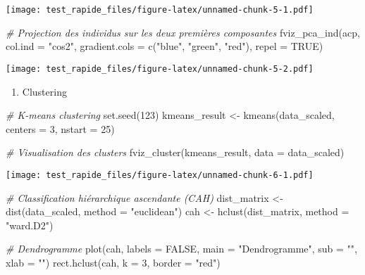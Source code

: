 \documentclass[
]{article}
\newenvironment{Shaded}{\begin{snugshade}}{\end{snugshade}}
\newcommand{\AttributeTok}[1]{\textcolor[rgb]{0.77,0.63,0.00}{#1}}
\newcommand{\CommentTok}[1]{\textcolor[rgb]{0.56,0.35,0.01}{\textit{#1}}}
\newcommand{\ConstantTok}[1]{\textcolor[rgb]{0.00,0.00,0.00}{#1}}
\newcommand{\DecValTok}[1]{\textcolor[rgb]{0.00,0.00,0.81}{#1}}
\newcommand{\FunctionTok}[1]{\textcolor[rgb]{0.00,0.00,0.00}{#1}}
\newcommand{\NormalTok}[1]{#1}
\newcommand{\OtherTok}[1]{\textcolor[rgb]{0.56,0.35,0.01}{#1}}
\newcommand{\StringTok}[1]{\textcolor[rgb]{0.31,0.60,0.02}{#1}}
\providecommand{\tightlist}{%
  \setlength{\itemsep}{0pt}\setlength{\parskip}{0pt}}
\begin{document}
\texttt{[image: test\_rapide\_files/figure-latex/unnamed-chunk-5-1.pdf]}

\begin{Shaded}
\begin{Highlighting}[]
\CommentTok{\# Projection des individus sur les deux premières composantes}
\FunctionTok{fviz\_pca\_ind}\NormalTok{(acp, }\AttributeTok{col.ind =} \StringTok{"cos2"}\NormalTok{, }\AttributeTok{gradient.cols =} \FunctionTok{c}\NormalTok{(}\StringTok{"blue"}\NormalTok{, }\StringTok{"green"}\NormalTok{, }\StringTok{"red"}\NormalTok{), }\AttributeTok{repel =} \ConstantTok{TRUE}\NormalTok{)}
\end{Highlighting}
\end{Shaded}

\texttt{[image: test\_rapide\_files/figure-latex/unnamed-chunk-5-2.pdf]}

\begin{enumerate}
\def\labelenumi{\arabic{enumi}.}
\setcounter{enumi}{3}
\tightlist
\item
  Clustering
\end{enumerate}

\begin{Shaded}
\begin{Highlighting}[]
\CommentTok{\# K{-}means clustering}
\FunctionTok{set.seed}\NormalTok{(}\DecValTok{123}\NormalTok{)}
\NormalTok{kmeans\_result }\OtherTok{\textless{}{-}} \FunctionTok{kmeans}\NormalTok{(data\_scaled, }\AttributeTok{centers =} \DecValTok{3}\NormalTok{, }\AttributeTok{nstart =} \DecValTok{25}\NormalTok{)}

\CommentTok{\# Visualisation des clusters}
\FunctionTok{fviz\_cluster}\NormalTok{(kmeans\_result, }\AttributeTok{data =}\NormalTok{ data\_scaled)}
\end{Highlighting}
\end{Shaded}

\texttt{[image: test\_rapide\_files/figure-latex/unnamed-chunk-6-1.pdf]}

\begin{Shaded}
\begin{Highlighting}[]
\CommentTok{\# Classification hiérarchique ascendante (CAH)}
\NormalTok{dist\_matrix }\OtherTok{\textless{}{-}} \FunctionTok{dist}\NormalTok{(data\_scaled, }\AttributeTok{method =} \StringTok{"euclidean"}\NormalTok{)}
\NormalTok{cah }\OtherTok{\textless{}{-}} \FunctionTok{hclust}\NormalTok{(dist\_matrix, }\AttributeTok{method =} \StringTok{"ward.D2"}\NormalTok{)}

\CommentTok{\# Dendrogramme}
\FunctionTok{plot}\NormalTok{(cah, }\AttributeTok{labels =} \ConstantTok{FALSE}\NormalTok{, }\AttributeTok{main =} \StringTok{"Dendrogramme"}\NormalTok{, }\AttributeTok{sub =} \StringTok{""}\NormalTok{, }\AttributeTok{xlab =} \StringTok{""}\NormalTok{)}
\FunctionTok{rect.hclust}\NormalTok{(cah, }\AttributeTok{k =} \DecValTok{3}\NormalTok{, }\AttributeTok{border =} \StringTok{"red"}\NormalTok{)}
\end{Highlighting}
\end{Shaded}
\end{document}
